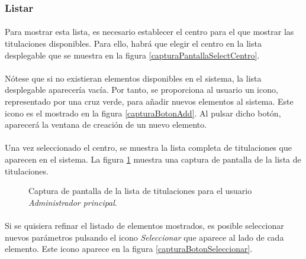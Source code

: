 \subsubsection{Listar}

  \paragraph{}Para mostrar esta lista, es necesario establecer el centro para
  el que mostrar las titulaciones disponibles. Para ello, habrá que elegir el
  centro en la lista desplegable que se muestra en la figura
  \ref{capturaPantallaSelectCentro}.

  \paragraph{}Nótese que si no existieran elementos disponibles en el sistema,
  la lista desplegable aparecería vacía. Por tanto, se proporciona al usuario
  un icono, representado por una cruz verde, para añadir nuevos elementos al
  sistema. Este icono es el mostrado en la figura \ref{capturaBotonAdd}. Al
  pulsar dicho botón, aparecerá la ventana de creación de un nuevo elemento.

  \paragraph{}Una vez seleccionado el centro, se muestra la lista completa de
  titulaciones que aparecen en el sistema. La figura
  \ref{capturaPantallaListaTitulacionesAdminPrincipal} muestra
  una captura de pantalla de la lista de titulaciones.

  \begin{figure}[!ht]
    \begin{center}
      \caption{Captura de pantalla de la lista de titulaciones para el usuario \textit{Administrador principal}.}
      \label{capturaPantallaListaTitulacionesAdminPrincipal}
    \end{center}
  \end{figure}

  \paragraph{}Si se quisiera refinar el listado de elementos mostrados, es
  posible seleccionar nuevos parámetros pulsando el icono \textit{Seleccionar}
  que aparece al lado de cada elemento. Este icono aparece en la figura
  \ref{capturaBotonSeleccionar}.